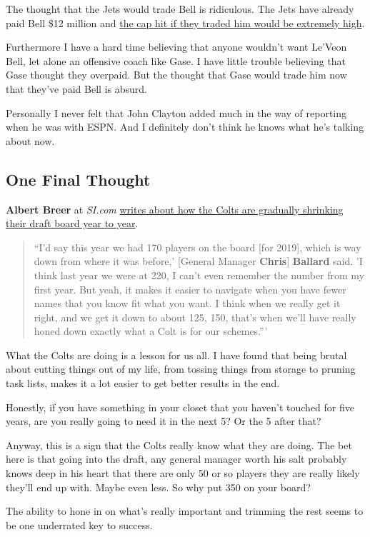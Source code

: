 \documentclass[11pt]{article}
\begin{document}
\begin{itemize}
The thought that the Jets would trade Bell is ridiculous.  The Jets have already paid Bell \$12 million and \href{https://overthecap.com/player/leveon-bell/2258/}{the cap hit if they traded him would be extremely high}.

Furthermore I have a hard time believing that anyone wouldn't want Le'Veon Bell, let alone an offensive coach like Gase.  I have little trouble believing that Gase thought they overpaid.  But the thought that Gase would trade him now that they've paid Bell is absurd.

Personally I never felt that John Clayton added much in the way of reporting when he was with ESPN.  And I definitely don’t think he knows what he’s talking about now.

\end{itemize}


\subsection{One Final Thought}
\textbf{Albert Breer} at \emph{SI.com} \href{https://www.si.com/nfl/2019/05/20/colts-2019-offseason-chris-ballard-chris-long-retirement-patrick-peterson-suspension-mmqb}{writes about how the Colts are gradually shrinking their draft board year to year}.

\begin{quote}
``I’d say this year we had 170 players on the board [for 2019], which is way down from where it was before,' [General Manager \textbf{Chris}] \textbf{Ballard} said. 'I think last year we were at 220, I can’t even remember the number from my first year. But yeah, it makes it easier to navigate when you have fewer names that you know fit what you want. I think when we really get it right, and we get it down to about 125, 150, that’s when we’ll have really honed down exactly what a Colt is for our schemes.'''
\end{quote}

What the Colts are doing is a lesson for us all.  I have found that being brutal about cutting things out of my life, from tossing things from storage to pruning task lists, makes it a lot easier to get better results in the end.

Honestly, if you have something in your closet that you haven't touched for five years, are you really going to need it in the next 5?  Or the 5 after that?

Anyway, this is a sign that the Colts really know what they are doing.  The bet here is that going into the draft, any general manager worth his salt probably knows deep in his heart that there are only 50 or so players they are really likely they'll end up with.  Maybe even less.  So why put 350 on your board?

The ability to hone in on what's really important and trimming the rest seems to be one underrated key to success.
\end{document}
